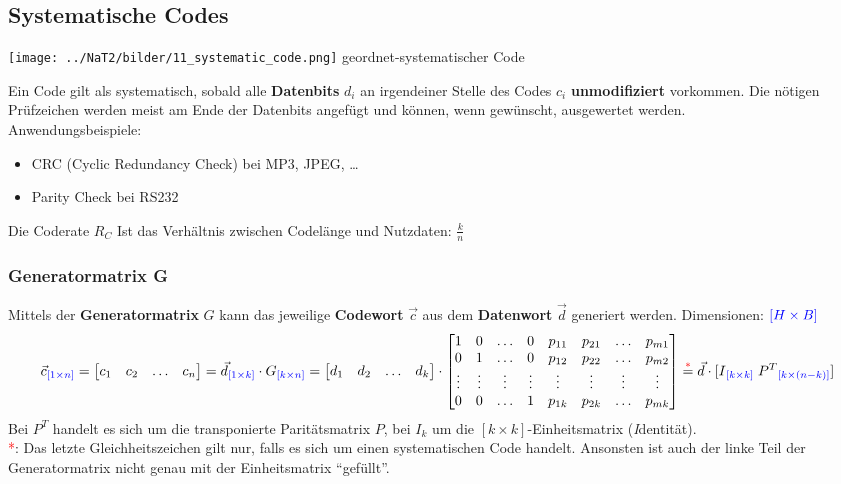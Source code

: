 \subsection{Systematische Codes }
\begin{minipage}{5.5cm}
	\texttt{[image: ../NaT2/bilder/11\_systematic\_code.png]}
	\centering geordnet-systematischer Code
\end{minipage}
\begin{minipage}{12.8cm}
	Ein Code gilt als systematisch, sobald alle \textbf{Datenbits} $d_i$ an irgendeiner Stelle des Codes $c_i$
	\textbf{unmodifiziert} vorkommen. Die nötigen Prüfzeichen werden meist am Ende
	der Datenbits angefügt und können, wenn gewünscht, ausgewertet werden.\\ Anwendungsbeispiele:
	\begin{itemize}
    	\item CRC (Cyclic Redundancy Check) bei MP3, JPEG, \ldots
    	\item Parity Check bei RS232
  	\end{itemize}	
	Die Coderate $R_C$ Ist das Verhältnis zwischen Codelänge und Nutzdaten: $\frac{k}{n}$
\end{minipage} 

\subsubsection{Generatormatrix G}
Mittels der \textbf{Generatormatrix} $G$ kann das jeweilige \textbf{Codewort} $\vec{c}$ aus dem \textbf{Datenwort} $\vec{d}$
generiert werden. Dimensionen: $\textcolor{blue}{[H\times B]}$
$$ \vec{c}\textcolor{blue}{_{[1 \times n]}} = \begin{bmatrix} c_1 & c_2 & \ldots & c_n \end{bmatrix} =
\vec{d}\textcolor{blue}{_{[1 \times k]}} \cdot G\textcolor{blue}{_{[k \times n]}} =
                \begin{bmatrix} d_1 & d_2 & \ldots & d_k \end{bmatrix} 
				\cdot \begin{bmatrix} 
					1 & 0 & \ldots & 0 & p_{11} & p_{21} & \ldots & p_{m1} \\              
					0 & 1 & \ldots & 0 & p_{12} & p_{22} & \ldots & p_{m2} \\
					\vdots & \vdots & \vdots & \vdots & \vdots & \vdots & \vdots & \vdots \\
					0 & 0 & \ldots & 1 & p_{1k} & p_{2k} & \ldots & p_{mk} \\
				\end{bmatrix} \overset{\textcolor{red}{*}}{=} \vec{d} \cdot [I\textcolor{blue}{_{[k \times k]}} \;
				P^T\textcolor{blue}{_{[k \times (n-k)]}}] $$ Bei $P^T$ handelt es sich um die transponierte
				Paritätsmatrix $P$, bei $I_k$ um die $[k \times k]$-Einheitsmatrix (\emph{I}dentität). \\
\textcolor{red}{*}: Das letzte Gleichheitszeichen gilt nur, falls
es sich um einen systematischen Code handelt. Ansonsten ist auch der linke Teil der Generatormatrix
nicht genau mit der Einheitsmatrix ``gefüllt''.

